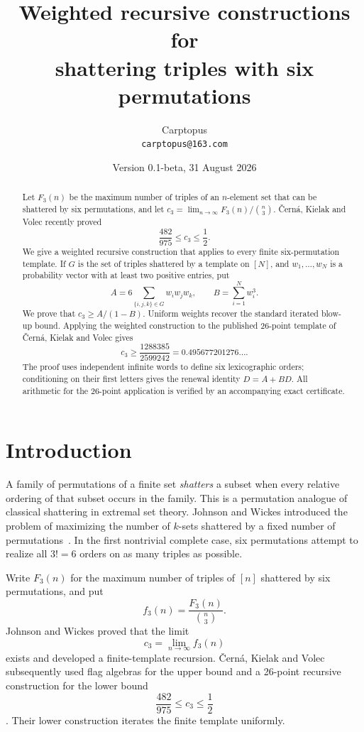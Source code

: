 \documentclass[11pt]{article}
\title{Weighted recursive constructions for\\
shattering triples with six permutations}
\author{Carptopus\\\small\texttt{carptopus@163.com}}
\date{Version 0.1-beta, 31 August 2026}
\begin{document}
\maketitle

\begin{abstract}
Let $F_3(n)$ be the maximum number of triples of an $n$-element set that can
be shattered by six permutations, and let
$c_3=\lim_{n\to\infty}F_3(n)/\binom n3$.  \v{C}ern\'a, Kielak and Volec
recently proved
\[
\frac{482}{975}\le c_3\le\frac12.
\]
We give a weighted recursive construction that applies to every finite
six-permutation template.  If $G$ is the set of triples shattered by a
template on $[N]$, and $w_1,\ldots,w_N$ is a probability vector with at least
two positive entries, put
\[
A=6\sum_{\{i,j,k\}\in G}w_iw_jw_k,
\qquad B=\sum_{i=1}^Nw_i^3.
\]
We prove that $c_3\ge A/(1-B)$.  Uniform weights recover the standard
iterated blow-up bound.  Applying the weighted construction to the published
26-point template of \v{C}ern\'a, Kielak and Volec gives
\[
\boxed{c_3\ge\frac{1288385}{2599242}
=0.495677201276\ldots}.
\]
The proof uses independent infinite words to define six lexicographic orders;
conditioning on their first letters gives the renewal identity $D=A+BD$.
All arithmetic for the 26-point application is verified by an accompanying
exact certificate.
\end{abstract}

\section{Introduction}

A family of permutations of a finite set \emph{shatters} a subset when every
relative ordering of that subset occurs in the family.  This is a permutation
analogue of classical shattering in extremal set theory.  Johnson and Wickes
introduced the problem of maximizing the number of $k$-sets shattered by a
fixed number of permutations~\cite{johnson-wickes}.  In the first nontrivial
complete case, six permutations attempt to realize all $3!=6$ orders on as
many triples as possible.

Write $F_3(n)$ for the maximum number of triples of $[n]$ shattered by six
permutations, and put
\[
f_3(n)=\frac{F_3(n)}{\binom n3}.
\]
Johnson and Wickes proved that the limit
\[
c_3=\lim_{n\to\infty}f_3(n)
\]
exists and developed a finite-template recursion.  \v{C}ern\'a, Kielak and
Volec subsequently used flag algebras for the upper bound and a 26-point
recursive construction for the lower bound
\[
\frac{482}{975}\le c_3\le\frac12
\]
\cite{cerna-kielak-volec}.  Their lower construction iterates the finite
template uniformly.
\end{document}
